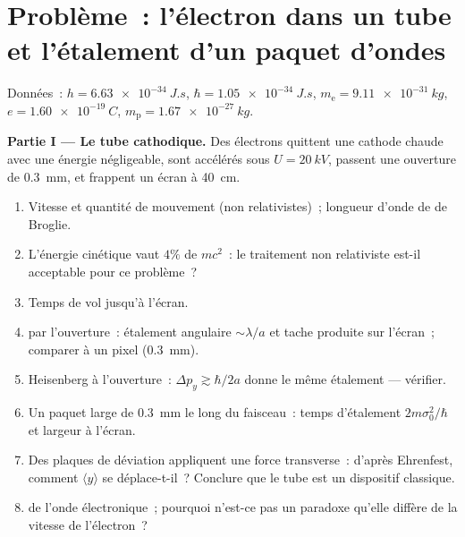 \section{Problème~: l'électron dans un tube et l'étalement d'un paquet d'ondes}

\begin{problem}\label{pb:b2:schrodinger-wave-functions:1}
Données~: $h = \qty{6.63e-34}{J.s}$, $\hbar = \qty{1.05e-34}{J.s}$, $m_{\text{e}} =
\qty{9.11e-31}{kg}$, $e = \qty{1.60e-19}{C}$, $m_{\text{p}} = \qty{1.67e-27}{kg}$.

\textbf{Partie I --- Le tube cathodique.}
Des électrons quittent une cathode chaude avec une énergie négligeable, sont accélérés
sous $U = \qty{20}{kV}$, passent une ouverture de \qty{0.3}{mm}, et frappent un
écran à \qty{40}{cm}.
\begin{enumerate}
  \item Vitesse et quantité de mouvement (non relativistes)~; longueur d'onde de de Broglie.
  \item L'énergie cinétique vaut $4\%$ de $mc^2$~: le traitement non relativiste
        est-il acceptable pour ce problème~?
  \item Temps de vol jusqu'à l'écran.
  \item {} par l'ouverture~: étalement angulaire $\sim\lambda/a$ et
        tache produite sur l'écran~; comparer à un pixel
        (\qty{0.3}{mm}).
  \item Heisenberg à l'ouverture~: $\Delta p_y \gtrsim \hbar/2a$ donne le
        même étalement --- vérifier.
  \item Un paquet large de \qty{0.3}{mm} le long du faisceau~: temps d'étalement
        $2m\sigma_0^2/\hbar$ et largeur à l'écran.
  \item Des plaques de déviation appliquent une force transverse~: d'après Ehrenfest, comment
        $\langle y\rangle$ se déplace-t-il~? Conclure que le tube est un
        dispositif classique.
  \item {} de l'onde électronique~; pourquoi n'est-ce pas un paradoxe
        qu'elle diffère de la vitesse de l'électron~?
\end{enumerate}


\end{problem}
